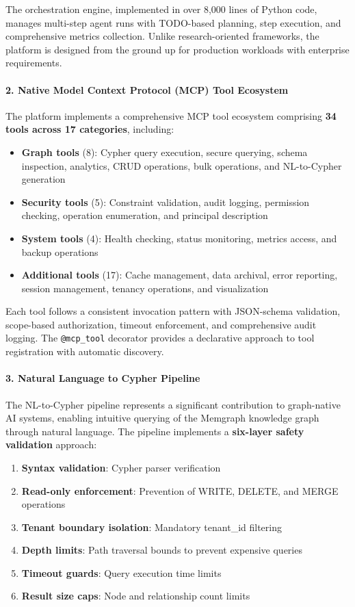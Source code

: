 The orchestration engine, implemented in over 8,000 lines of Python code, manages multi-step agent runs with TODO-based planning, step execution, and comprehensive metrics collection. Unlike research-oriented frameworks, the platform is designed from the ground up for production workloads with enterprise requirements.

\paragraph{2. Native Model Context Protocol (MCP) Tool Ecosystem}

The platform implements a comprehensive MCP tool ecosystem comprising \textbf{34 tools across 17 categories}, including:

\begin{itemize}
    \item \textbf{Graph tools} (8): Cypher query execution, secure querying, schema inspection, analytics, CRUD operations, bulk operations, and NL-to-Cypher generation
    \item \textbf{Security tools} (5): Constraint validation, audit logging, permission checking, operation enumeration, and principal description
    \item \textbf{System tools} (4): Health checking, status monitoring, metrics access, and backup operations
    \item \textbf{Additional tools} (17): Cache management, data archival, error reporting, session management, tenancy operations, and visualization
\end{itemize}

Each tool follows a consistent invocation pattern with JSON-schema validation, scope-based authorization, timeout enforcement, and comprehensive audit logging. The \texttt{@mcp\_tool} decorator provides a declarative approach to tool registration with automatic discovery.

\paragraph{3. Natural Language to Cypher Pipeline}

The NL-to-Cypher pipeline represents a significant contribution to graph-native AI systems, enabling intuitive querying of the Memgraph knowledge graph through natural language. The pipeline implements a \textbf{six-layer safety validation} approach:

\begin{enumerate}
    \item \textbf{Syntax validation}: Cypher parser verification
    \item \textbf{Read-only enforcement}: Prevention of WRITE, DELETE, and MERGE operations
    \item \textbf{Tenant boundary isolation}: Mandatory tenant\_id filtering
    \item \textbf{Depth limits}: Path traversal bounds to prevent expensive queries
    \item \textbf{Timeout guards}: Query execution time limits
    \item \textbf{Result size caps}: Node and relationship count limits
\end{enumerate}

